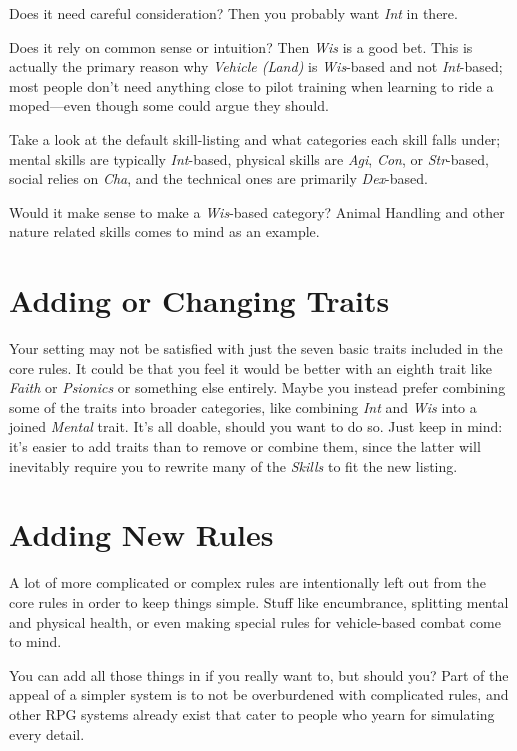 Does it need careful consideration? Then you probably want \textit{Int} in there.

Does it rely on common sense or intuition? Then \textit{Wis} is a good bet.
This is actually the primary reason why \textit{Vehicle (Land)} is \textit{Wis}-based and not \textit{Int}-based; most people don't need anything close to pilot training when learning to ride a moped---even though some could argue they should.

Take a look at the default skill-listing and what categories each skill falls under; mental skills are typically \textit{Int}-based, physical skills are \textit{Agi}, \textit{Con}, or \textit{Str}-based, social relies on \textit{Cha}, and the technical ones are primarily \textit{Dex}-based.

Would it make sense to make a \textit{Wis}-based category? Animal Handling and other nature related skills comes to mind as an example.

\section{Adding or Changing Traits}
Your setting may not be satisfied with just the seven basic traits included in the core rules.
It could be that you feel it would be better with an eighth trait like \textit{Faith} or \textit{Psionics} or something else entirely.
Maybe you instead prefer combining some of the traits into broader categories, like combining \textit{Int} and \textit{Wis} into a joined \textit{Mental} trait.
It's all doable, should you want to do so.
Just keep in mind: it's easier to add traits than to remove or combine them, since the latter will inevitably require you to rewrite many of the \textit{Skills} to fit the new listing.

\section{Adding New Rules}
A lot of more complicated or complex rules are intentionally left out from the core rules in order to keep things simple.
Stuff like encumbrance, splitting mental and physical health, or even making special rules for vehicle-based combat come to mind.

You can add all those things in if you really want to, but should you?
Part of the appeal of a simpler system is to not be overburdened with complicated rules, and other RPG systems already exist that cater to people who yearn for simulating every detail.

